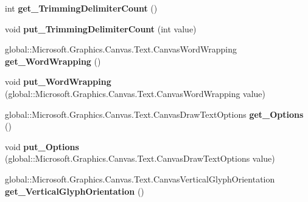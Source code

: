 \begin{DoxyCompactItemize}
int {\bfseries get\+\_\+\+Trimming\+Delimiter\+Count} ()
\item 
\mbox{\label{interface_microsoft_1_1_graphics_1_1_canvas_1_1_text_1_1_i_canvas_text_format_af82b609763bb9627688ef6dadfc58009}} 
void {\bfseries put\+\_\+\+Trimming\+Delimiter\+Count} (int value)
\item 
\mbox{\label{interface_microsoft_1_1_graphics_1_1_canvas_1_1_text_1_1_i_canvas_text_format_ad3a64c7bf2382793d928c1f6e15fc7f4}} 
global\+::\+Microsoft.\+Graphics.\+Canvas.\+Text.\+Canvas\+Word\+Wrapping {\bfseries get\+\_\+\+Word\+Wrapping} ()
\item 
\mbox{\label{interface_microsoft_1_1_graphics_1_1_canvas_1_1_text_1_1_i_canvas_text_format_a94d68cdaaf91c785c91ff377408932d4}} 
void {\bfseries put\+\_\+\+Word\+Wrapping} (global\+::\+Microsoft.\+Graphics.\+Canvas.\+Text.\+Canvas\+Word\+Wrapping value)
\item 
\mbox{\label{interface_microsoft_1_1_graphics_1_1_canvas_1_1_text_1_1_i_canvas_text_format_a208378a52440f0dccacbf5a5208e2e6d}} 
global\+::\+Microsoft.\+Graphics.\+Canvas.\+Text.\+Canvas\+Draw\+Text\+Options {\bfseries get\+\_\+\+Options} ()
\item 
\mbox{\label{interface_microsoft_1_1_graphics_1_1_canvas_1_1_text_1_1_i_canvas_text_format_a2f0c996edcd441c91461fbf033bf1203}} 
void {\bfseries put\+\_\+\+Options} (global\+::\+Microsoft.\+Graphics.\+Canvas.\+Text.\+Canvas\+Draw\+Text\+Options value)
\item 
\mbox{\label{interface_microsoft_1_1_graphics_1_1_canvas_1_1_text_1_1_i_canvas_text_format_abc2a32d3aacea2f49232cd218d252da8}} 
global\+::\+Microsoft.\+Graphics.\+Canvas.\+Text.\+Canvas\+Vertical\+Glyph\+Orientation {\bfseries get\+\_\+\+Vertical\+Glyph\+Orientation} ()
\item 
\mbox{\label{interface_microsoft_1_1_graphics_1_1_canvas_1_1_text_1_1_i_canvas_text_format_a4f0382db5faf99e239642e76ec8e2269}} 

\end{DoxyCompactItemize}
